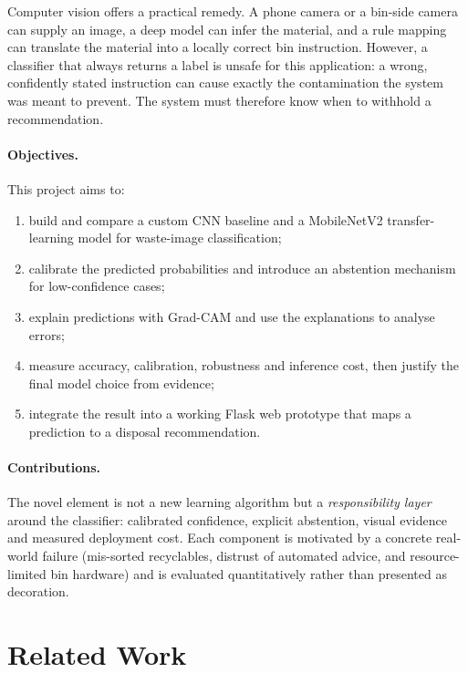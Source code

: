 \documentclass[11pt,a4paper]{article}
\begin{document}
Computer vision offers a practical remedy. A phone camera or a bin-side camera can supply
an image, a deep model can infer the material, and a rule mapping can translate the
material into a locally correct bin instruction. However, a classifier that always returns
a label is unsafe for this application: a wrong, confidently stated instruction can cause
exactly the contamination the system was meant to prevent. The system must therefore know
when to withhold a recommendation.

\paragraph{Objectives.} This project aims to:
\begin{enumerate}
  \item build and compare a custom CNN baseline and a MobileNetV2 transfer-learning model
        for waste-image classification;
  \item calibrate the predicted probabilities and introduce an abstention mechanism for
        low-confidence cases;
  \item explain predictions with Grad-CAM and use the explanations to analyse errors;
  \item measure accuracy, calibration, robustness and inference cost, then justify the
        final model choice from evidence;
  \item integrate the result into a working Flask web prototype that maps a prediction to
        a disposal recommendation.
\end{enumerate}

\paragraph{Contributions.} The novel element is not a new learning algorithm but a
\textit{responsibility layer} around the classifier: calibrated confidence, explicit
abstention, visual evidence and measured deployment cost. Each component is motivated by
a concrete real-world failure (mis-sorted recyclables, distrust of automated advice, and
resource-limited bin hardware) and is evaluated quantitatively rather than presented as
decoration.

\section{Related Work}
\label{sec:related}
\end{document}
